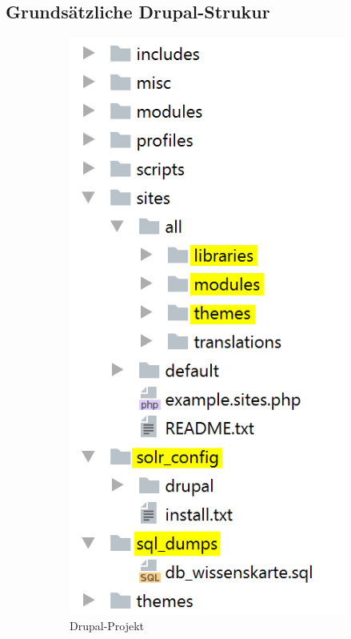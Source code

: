 \subsection{Grundsätzliche Drupal-Strukur}\label{sub:strukture_project}
\begin{figure}[!h]
	\centering
	\begin{subfigure}[a]{0.4\textwidth}
		\centering
		\includegraphics[height=0.25\textheight]{images/structure_project}
		\caption[]{Drupal-Projekt}
		\label{fig:structureproject}
	\end{subfigure}
	\begin{subfigure}[A]{0.4\textwidth}
		\centering

\end{subfigure}
\end{figure}
